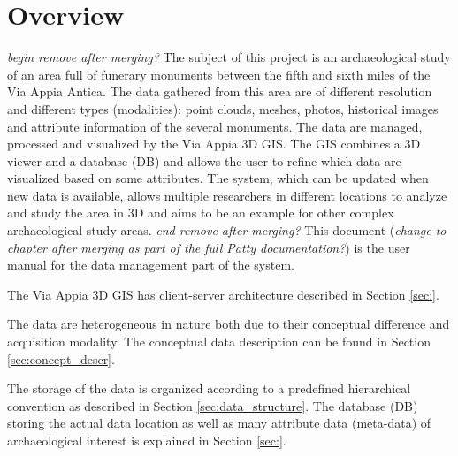 \section{Overview}
\label{sec:dataman_overview}

{\em begin remove after merging?} The subject of this project is an archaeological study of an area full of funerary monuments between the fifth and sixth miles of the Via Appia Antica. The data gathered from this area are of different resolution and different types (modalities): point clouds, meshes, photos, historical images and attribute information of the several monuments. The data are managed, processed and visualized by the Via Appia 3D GIS. The GIS combines a 3D viewer and a database (DB) and allows the user to refine which data are visualized based on some attributes. The system, which can be updated when new data is available, allows multiple researchers in different locations to analyze and study the area in 3D and aims to be an example for other complex archaeological study areas. {\em end remove after merging?} This document ({\em change to chapter after merging as part of the full Patty documentation?}) is the user manual for the data management part of the system.

The Via Appia 3D GIS has client-server architecture described in Section \ref{sec:}.

 The data are heterogeneous in nature both due to their conceptual difference and acquisition modality. The conceptual data description can be found in Section \ref{sec:concept_descr}. 

The storage of the data is organized according to a predefined hierarchical convention as described in Section \ref{sec:data_structure}. The database (DB) storing the actual data location as well as many attribute data (meta-data) of archaeological interest is explained in Section \ref{sec:}.   